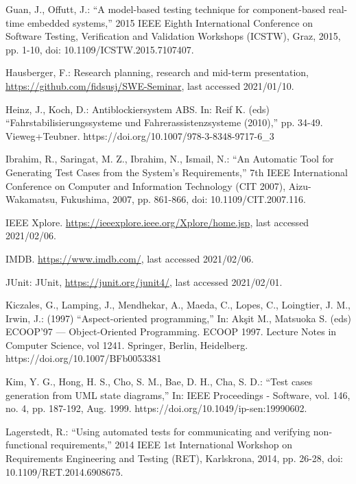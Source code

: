 \documentclass[a4paper,10pt, bibliography=totocnumbered]{scrreprt}
\begin{document}
\begin{thebibliography}{9}
 Guan, J., Offutt, J.: \enquote{A model-based testing technique for component-based real-time embedded systems,} 2015 IEEE Eighth International Conference on Software Testing, Verification and Validation Workshops (ICSTW), Graz, 2015, pp. 1-10, doi: 10.1109/ICSTW.2015.7107407.

 Hausberger, F.: Research planning, research and mid-term presentation, \url{https://github.com/fidsusj/SWE-Seminar}, last accessed 2021/01/10.

 Heinz, J., Koch, D.: Antiblockiersystem ABS.
In: Reif K. (eds) \enquote{Fahrstabilisierungssysteme und Fahrerassistenzsysteme (2010),} pp. 34-49. Vieweg+Teubner. 
https://doi.org/10.1007/978-3-8348-9717-6\_3

 Ibrahim, R., Saringat, M. Z., Ibrahim, N., Ismail, N.: \enquote{An Automatic Tool for Generating Test Cases from the System's Requirements,} 7th IEEE International Conference on Computer and Information Technology (CIT 2007), Aizu-Wakamatsu, Fukushima, 2007, pp. 861-866, doi: 10.1109/CIT.2007.116.

 IEEE Xplore. \url{https://ieeexplore.ieee.org/Xplore/home.jsp}, last accessed 2021/02/06.

 IMDB. \url{https://www.imdb.com/}, last accessed 2021/02/06.

 JUnit: JUnit, \url{https://junit.org/junit4/}, last accessed 2021/02/01.

 Kiczales, G., Lamping, J., Mendhekar, A., Maeda, C., Lopes, C., Loingtier, J. M., Irwin, J.: (1997) \enquote{Aspect-oriented programming,} In: Akşit M., Matsuoka S. (eds) ECOOP'97 — Object-Oriented Programming. ECOOP 1997. Lecture Notes in Computer Science, vol 1241. Springer, Berlin, Heidelberg.
https://doi.org/10.1007/BFb0053381

 Kim, Y. G., Hong, H. S., Cho, S. M., Bae, D. H., Cha, S. D.: \enquote{Test cases generation from UML state diagrams,}
In: IEEE Proceedings - Software, vol. 146, no. 4, pp. 187-192, Aug. 1999.
https://doi.org/10.1049/ip-sen:19990602.

 Lagerstedt, R.: \enquote{Using automated tests for communicating and verifying non-functional requirements,} 2014 IEEE 1st International Workshop on Requirements Engineering and Testing (RET), Karlskrona, 2014, pp. 26-28, doi: 10.1109/RET.2014.6908675.


\end{thebibliography}
\end{document}
